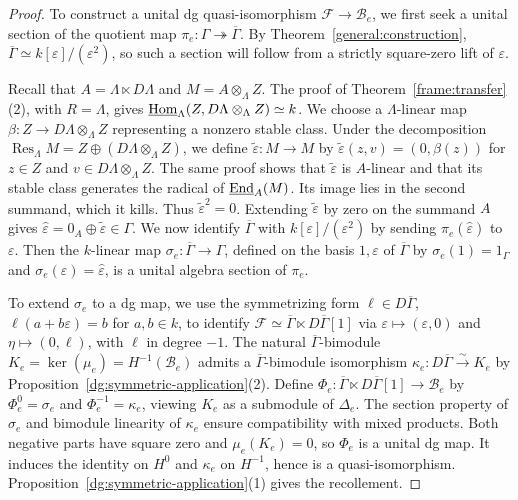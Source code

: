 \documentclass[11pt]{article}
\begin{document}
\begin{proof}
To construct a unital dg quasi-isomorphism $\mathcal F\to\mathcal B_e$,
we first seek a unital section of the quotient map
$\pi_e:\Gamma\twoheadrightarrow\overline\Gamma$.
By Theorem~\ref{general:construction},
$\overline\Gamma\simeq k[\varepsilon]/(\varepsilon^2)$, so such a section
will follow from a strictly square-zero lift of $\varepsilon$.

Recall that $A=\Lambda\ltimes D\Lambda$ and $M=A\otimes_\Lambda Z$.
The proof of Theorem~\ref{frame:transfer}\textup{(2)}, with $R=\Lambda$,
gives $\underline{{\rm Hom}}_\Lambda(Z,D\Lambda\otimes_\Lambda Z)\simeq k$.
We choose a $\Lambda$-linear map $\beta:Z\to D\Lambda\otimes_\Lambda Z$
representing a nonzero stable class. Under the decomposition
$\operatorname{Res}_\Lambda M=Z\oplus(D\Lambda\otimes_\Lambda Z)$,
we define $\widetilde\varepsilon:M\to M$ by
$\widetilde\varepsilon(z,v)=(0,\beta(z))$ for
$z\in Z$ and $v\in D\Lambda\otimes_\Lambda Z$.
The same proof shows that $\widetilde\varepsilon$ is $A$-linear
and that its stable class generates the radical of
$\underline{{\rm End}}_A(M)$.
Its image lies in the second summand, which it kills. Thus
$\widetilde\varepsilon^2=0$.
Extending $\widetilde\varepsilon$ by zero on the summand $A$ gives
$\widehat\varepsilon=0_A\oplus\widetilde\varepsilon\in\Gamma$.
We now identify $\overline\Gamma$ with $k[\varepsilon]/(\varepsilon^2)$
by sending $\pi_e(\widehat\varepsilon)$ to $\varepsilon$.
Then the $k$-linear map $\sigma_e:\overline\Gamma\to\Gamma$, defined on the basis
$1,\varepsilon$ of $\overline\Gamma$ by
$\sigma_e(1)=1_\Gamma$ and $\sigma_e(\varepsilon)=\widehat\varepsilon$,
is a unital algebra section of $\pi_e$.

To extend $\sigma_e$ to a dg map, we use the symmetrizing form
$\ell\in D\overline\Gamma$, $\ell(a+b\varepsilon)=b$ for $a,b\in k$,
to identify $\mathcal F\simeq\overline\Gamma\ltimes D\overline\Gamma[1]$
via $\varepsilon\mapsto(\varepsilon,0)$ and $\eta\mapsto(0,\ell)$,
with $\ell$ in degree $-1$.
The natural $\overline\Gamma$-bimodule
$K_e=\ker(\mu_e)=H^{-1}(\mathcal B_e)$ admits a $\overline\Gamma$-bimodule isomorphism
$\kappa_e:D\overline\Gamma\xrightarrow{\sim}K_e$
by Proposition~\ref{dg:symmetric-application}\textup{(2)}.
Define $\Phi_e:\overline\Gamma\ltimes D\overline\Gamma[1]\to\mathcal B_e$
by $\Phi_e^0=\sigma_e$ and $\Phi_e^{-1}=\kappa_e$,
viewing $K_e$ as a submodule of $\Delta_e$.
The section property of $\sigma_e$ and bimodule linearity of $\kappa_e$
ensure compatibility with mixed products.
Both negative parts have square zero and $\mu_e(K_e)=0$,
so $\Phi_e$ is a unital dg map.
It induces the identity on $H^0$ and $\kappa_e$ on $H^{-1}$,
hence is a quasi-isomorphism.
Proposition~\ref{dg:symmetric-application}\textup{(1)} gives the recollement.\qedhere
\end{proof}
\end{document}
